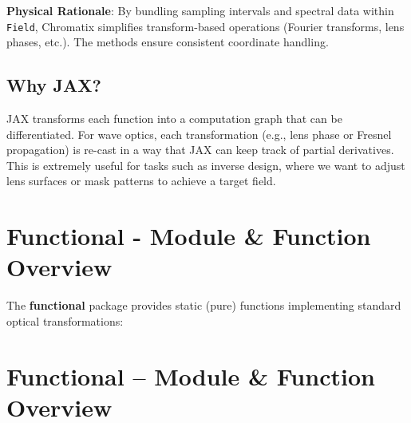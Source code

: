 \documentclass[a4paper,12pt]{report}
\begin{document}
\noindent\textbf{Physical Rationale}: By bundling sampling intervals and spectral data within \texttt{Field}, Chromatix simplifies transform-based operations (Fourier transforms, lens phases, etc.). The methods ensure consistent coordinate handling.

\subsection{Why JAX?}
JAX transforms each function into a computation graph that can be differentiated. For wave optics, each transformation (e.g., lens phase or Fresnel propagation) is re-cast in a way that JAX can keep track of partial derivatives. This is extremely useful for tasks such as inverse design, where we want to adjust lens surfaces or mask patterns to achieve a target field.

\section{Functional - Module \& Function Overview}
The \textbf{functional} package provides static (pure) functions implementing standard optical transformations:
\usepackage{enumitem}

\section{Functional – Module \& Function Overview}
\end{document}
